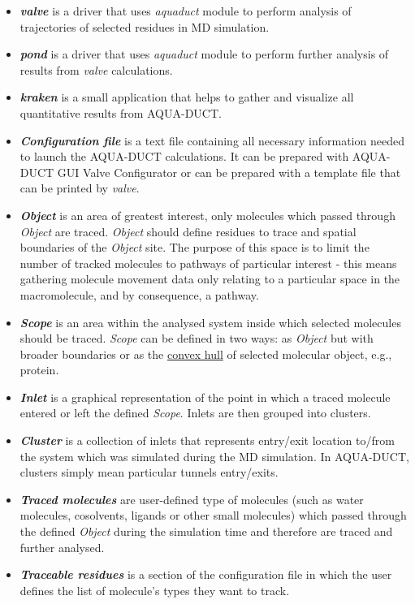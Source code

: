 \documentclass[9pt,tutorial, pubversion]{livecoms}
\begin{document}
\begin{itemize}
\item \textbf{\textit{valve}} is a driver that uses \textit{aquaduct} module to perform analysis of trajectories of selected residues in MD simulation.
\item \textbf{\textit{pond}} is a driver that uses \textit{aquaduct} module to perform further analysis of results from \textit{valve} calculations.
\item \textbf{\textit{kraken}} is a small application that helps to gather and visualize all quantitative results from AQUA-DUCT.
\item \textbf{\textit{Configuration file}} is a text file containing all necessary information needed to launch the AQUA-DUCT calculations. It can be prepared with AQUA-DUCT GUI Valve Configurator or can be prepared with a template file that can be printed by \textit{valve}.
\item \textbf{\textit{Object}} is an area of greatest interest, only molecules which passed through \textit{Object} are traced. \textit{Object} should define residues to trace and spatial boundaries of the \textit{Object} site. The purpose of this space is to limit the number of tracked molecules to pathways of particular interest - this means gathering molecule movement data only relating to a particular space in the macromolecule, and by consequence, a pathway.
\item \textbf{\textit{Scope}} is an area within the analysed system inside which selected molecules should be traced. \textit{Scope} can be defined in two ways: as \textit{Object} but with broader boundaries or as the \href{https://tunneling-group.github.io/aqua-duct/valve/valve_manual.html?highlight=convex\%20hull#convex-hulls-of-macromolecule-atoms}{convex hull} of selected molecular object, e.g., protein.
\item \textbf{\textit{Inlet}} is a graphical representation of the point in which a traced molecule entered or left the defined \textit{Scope}. Inlets are then grouped into clusters.
\item \textbf{\textit{Cluster}} is a collection of inlets that represents entry/exit location to/from the system which was simulated during the MD simulation. In AQUA-DUCT, clusters simply mean particular tunnels entry/exits.
\item \textbf{\textit{Traced molecules}} are user-defined type of molecules (such as water molecules, cosolvents, ligands or other small molecules) which passed through the defined \textit{Object} during the simulation time and therefore are traced and further analysed.
\item \textbf{\textit{Traceable residues}} is a section of the configuration file in which the user defines the list of molecule's types they want to track. 


\end{itemize}
\end{document}
